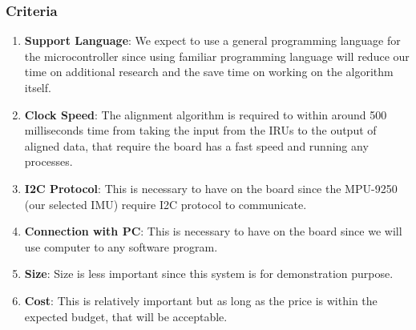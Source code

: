 \subsubsection{Criteria}
\begin{enumerate}
	\item \textbf{Support Language}: We expect to use a general programming language for the microcontroller since using familiar programming language will reduce our time on additional research and the save time on working on the algorithm itself.
	\item \textbf{Clock Speed}: The alignment algorithm is required to within around 500 milliseconds time from taking the input from the IRUs to the output of aligned data, that require the board has a fast speed and running any processes.
	\item \textbf{I2C Protocol}: This is necessary to have on the board since the MPU-9250 (our selected IMU) require I2C protocol to communicate.
	\item \textbf{Connection with PC}: This is necessary to have on the board since we will use computer to any software program.
	\item \textbf{Size}: Size is less important since this system is for demonstration purpose.
	\item \textbf{Cost}: This is relatively important but as long as the price is within the expected budget, that will be acceptable.\\
\end{enumerate}

\newpage
